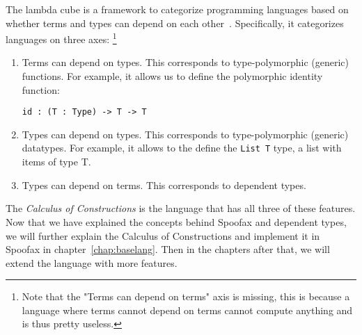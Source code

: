 The lambda cube is a framework to categorize programming languages based on whether terms and types can depend on each other~\cite{lambda_cube}. Specifically, it categorizes languages on three axes: \footnote{Note that the "Terms can depend on terms" axis is missing, this is because a language where terms cannot depend on terms cannot compute anything and is thus pretty useless.}

\begin{enumerate}
	\item Terms can depend on types. This corresponds to type-polymorphic (generic) functions. For example, it allows us to define the polymorphic identity function:
	\begin{lstlisting}
id : (T : Type) -> T -> T
	\end{lstlisting}
	\item Types can depend on types. This corresponds to type-polymorphic (generic) datatypes. For example, it allows to the define the \verb|List T| type, a list with items of type T.
	
	\item Types can depend on terms. This corresponds to dependent types.
\end{enumerate}

The \textit{Calculus of Constructions} is the language that has all three of these features. Now that we have explained the concepts behind Spoofax and dependent types, we will further explain the Calculus of Constructions and implement it in Spoofax in chapter~\ref{chap:baselang}. Then in the chapters after that, we will extend the language with more features.
